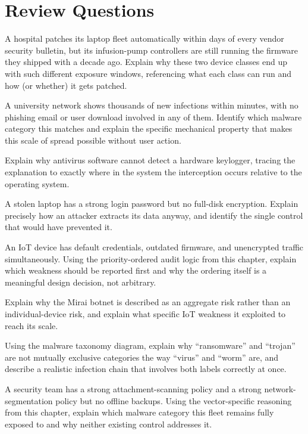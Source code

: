 \section*{Review Questions}
\begin{reviewquestions}
\item A hospital patches its laptop fleet automatically within days of every vendor security
bulletin, but its infusion-pump controllers are still running the firmware they shipped with a
decade ago. Explain why these two device classes end up with such different exposure windows,
referencing what each class can run and how (or whether) it gets patched.
\item A university network shows thousands of new infections within minutes, with no phishing
email or user download involved in any of them. Identify which malware category this matches and
explain the specific mechanical property that makes this scale of spread possible without user
action.
\item Explain why antivirus software cannot detect a hardware keylogger, tracing the explanation to
exactly where in the system the interception occurs relative to the operating system.
\item A stolen laptop has a strong login password but no full-disk encryption. Explain precisely
how an attacker extracts its data anyway, and identify the single control that would have
prevented it.
\item An IoT device has default credentials, outdated firmware, and unencrypted traffic
simultaneously. Using the priority-ordered audit logic from this chapter, explain which weakness
should be reported first and why the ordering itself is a meaningful design decision, not arbitrary.
\item Explain why the Mirai botnet is described as an aggregate risk rather than an individual-device
risk, and explain what specific IoT weakness it exploited to reach its scale.
\item Using the malware taxonomy diagram, explain why ``ransomware'' and ``trojan'' are not
mutually exclusive categories the way ``virus'' and ``worm'' are, and describe a realistic
infection chain that involves both labels correctly at once.
\item A security team has a strong attachment-scanning policy and a strong network-segmentation
policy but no offline backups. Using the vector-specific reasoning from this chapter, explain
which malware category this fleet remains fully exposed to and why neither existing control
addresses it.
\end{reviewquestions}

